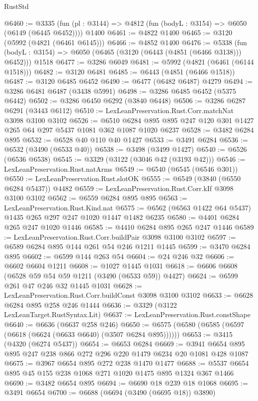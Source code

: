 \begin{lexlean}{RustStd}
\begin{coremodule}
{\begin{coremodule}
{{{{{{{{{{{{{{{{{{{{{{{{{{@6460 := @3335
    (fun (pl : @3144) => @4812 (fun (bodyL : @3154) => @6050 (@6149 (@6445 @6452))))
    @1400
@6461 := @4822 @1400
@6465 := @3120 (@5992 (@4821 (@6461 @6145)))
@6466 := @4852 @1400
@6476 := @5338
    (fun (bodyL : @3154) => @6050 (@6465 (@3120 (@6443 (@4851 (@6466 @3138))) @6452)))
    @1518
@6477 := @3286 @6049
@6481 := @5992 (@4821 (@6461 (@6144 @1518)))
@6482 := @3120 @6481
@6485 := @6443 (@4851 (@6466 @1518))
@6487 := @3120 @6485 @6452
@6490 := @6477 (@6482 @6487) @4279
@6494 := @3286 @6481 @6487 (@3438 @5991)
@6498 := @3286 @6485 @6452 (@5375 @6442)
@6502 := @3286 @6450 @6292 (@3840 @6448)
@6506 := @3286 @6287 @6291 (@3443 @6112)
@6510 := LexLeanPreservation.Rust.Corr.matchNat @3098 @3100 @3102
@6526 := @6510 @6284 @895 @895 @247 @120 @301 @1427 @265 @64 @297 @5437 @1081 @362 @1087 @1020 @6237
@6528 := @3482 @6284 @895
@6532 := @6528 @40 @110 @40 @1427
@6533 := @3491 @6284
@6536 := @6532 (@3490 (@6533 @40))
@6538 := @3498 (@3499 @1427)
@6540 := @6526 (@6536 @6538)
@6545 := @3329 (@3122 (@3046 @42 (@3193 @42)))
@6546 := LexLeanPreservation.Rust.natArms
@6549 := @6540 (@6545 (@6546 @301))
@6550 := LexLeanPreservation.Rust.slotOK
@6555 := @6549 (@3840 (@6550 @6284 @5437)) @4482
@6559 := LexLeanPreservation.Rust.Corr.kIf @3098 @3100 @3102
@6562 := @6559 @6284 @895 @895
@6563 := LexLeanPreservation.Rust.Kind.nat
@6575 := @6562 (@6563 @1422 @64 @5437) @1435 @265 @297 @247 @1020 @1447 @1482 @6235
@6580 := @4401 @6284 @265 @247 @1020 @1446
@6585 := @4410 @6284 @895 @265 @247 @1446
@6589 := LexLeanPreservation.Rust.Corr.buildPair @3098 @3100 @3102
@6597 := @6589 @6284 @895 @144 @261 @54 @246 @1211 @1445
@6599 := @3470 @6284 @895
@6602 := @6599 @144 @263 @54
@6604 := @24 @246 @32
@6606 := @6602 @6604 @1211
@6608 := @1027 @1445 @1031
@6618 := @6606 @6608 (@6528 @59 @54 @59 @1211 (@3490 (@6533 @59)) @4427)
@6624 := @6599 @261 @47 @246 @32 @1445 @1031
@6628 := LexLeanPreservation.Rust.Corr.buildConst @3098 @3100 @3102
@6633 := @6628 @6284 @895 @258 @246 @1444
@6636 := @3329 (@3122 LexLeanTarget.RustSyntax.Lit)
@6637 := LexLeanPreservation.Rust.constShape
@6640 := @6636 (@6637 @258 @246)
@6650 := @6575 (@6580 (@6585 (@6597 (@6618 (@6624 (@6633 @6640) (@3507 @6284 @895))))))
@6653 := @3415 (@4320 (@6274 @5437))
@6654 := @6653 @6284
@6669 := @3941 @6654 @895 @895 @247 @238 @866 @272 @296 @220 @1479 @6234 @20 @1081 @428 @1087
@6675 := @3967 @6654 @895 @272 @238 @1470 @1477
@6688 := @5537 @6654 @895 @45 @155 @238 @1068 @271 @1020 @1475 @895 @1324 @367 @1466
@6690 := @3482 @6654 @895
@6694 := @6690 @18 @239 @18 @1068
@6695 := @3491 @6654
@6700 := @6688 (@6694 (@3490 (@6695 @18)) @3890)
}}}}}}}}}}}}}}}}}}}}}}}}}}
\end{coremodule}}
\end{coremodule}
\end{lexlean}
